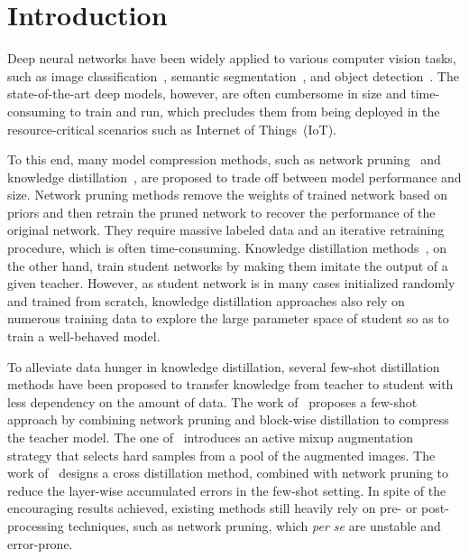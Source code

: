 \documentclass[letterpaper]{article} %
\begin{document}
\section{Introduction}
{
    Deep neural networks have been widely applied
    to various computer vision tasks, such as image
    classification~\cite{krizhevsky2012imagenet,simonyan2014very,szegedy2015going,he2016deep},
    semantic segmentation~\cite{long2015fully,chen2018deeplab,badrinarayananK17},
    and object detection~\cite{ren2015faster,liu2016ssd,zhang2018single}.
    The state-of-the-art deep models, however,
    are often cumbersome in size
    and time-consuming to train and run,
    which precludes them from being deployed in
    the resource-critical scenarios such as Internet of Things~(IoT).

    To this end, many model compression methods, such as network pruning~\cite{li2016pruning,han2015learning,wen2016learning}
    and knowledge distillation~\cite{hinton2015distilling,romero2015fitnets},
    are proposed to trade off between model performance and size.
    Network pruning methods remove the weights of trained network
    based on  priors and then retrain the pruned network to recover
    the performance of the original network.
    They require massive labeled data and an
    iterative retraining procedure, which is often time-consuming.
    Knowledge distillation methods~\cite{hinton2015distilling},
    on the other hand, {train student networks
    by making them imitate} the output of a given teacher.
    However, as student network is in many cases initialized randomly
    and trained from scratch,
    knowledge distillation approaches also rely on
    numerous training data to explore
    the large parameter space of student so as to train a well-behaved model.


    To alleviate data hunger in knowledge distillation,
    several few-shot distillation methods have been proposed
    to transfer knowledge from teacher to student
    with less dependency on the amount of data.
    The work of~\cite{li2018few} proposes a few-shot approach by
    combining network pruning and block-wise
    distillation to compress the teacher model.
    The one of~\cite{wang2020neural} introduces
    an active mixup augmentation strategy that
    selects hard samples from a pool of the augmented images.
    The work of~\cite{bai2019few} designs a
    cross distillation method, combined
    with network pruning to reduce the layer-wise
    accumulated errors in the few-shot setting.
    In spite of the encouraging results achieved,
    existing methods still heavily rely
    on pre- or post-processing techniques,
    such as network pruning,
    which {\emph{per se}} are unstable and error-prone.

}
\end{document}
